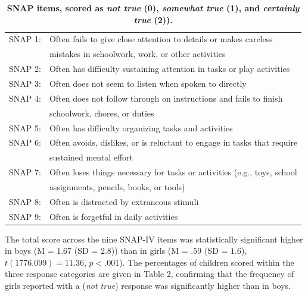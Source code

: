 \documentclass[10pt,letterpaper]{article}
\begin{document}
\begin{table}[!ht]
\begin{adjustwidth}{-5mm}{0in} %
\centering
\caption{\bf SNAP items, scored as \emph{not true} (0), \emph{somewhat true} (1), and \emph{certainly true} (2)).}
\vspace{5mm}
\begin{tabular}{|ll|}
\hline
SNAP 1: & Often fails to give close attention to details or makes careless\\ & mistakes in schoolwork, work, or other activities\\ \hline
SNAP 2: & Often has difficulty sustaining attention in tasks or play activities \\ \hline
SNAP 3: & Often does not seem to listen when spoken to directly \\ \hline
SNAP 4: & Often does not follow through on instructions and fails to finish\\ &  schoolwork, chores, or duties\\ \hline
SNAP 5: & Often has difficulty organizing tasks and activities \\ \hline
SNAP 6: & Often avoids, dislikes, or is reluctant to engage in tasks that require\\ & sustained mental effort\\ \hline
SNAP 7: & Often loses things necessary for tasks or activities (e.g., toys, school\\ &  assignments, pencils, books, or tools) \\ \hline
SNAP 8: & Often is distracted by extraneous stimuli\\ \hline
SNAP 9: & Often is forgetful in daily activities \\ \hline
\end{tabular}
\label{Table1}
\end{adjustwidth}
\end{table}

\vspace{5mm}

The total score across the nine SNAP-IV items was statistically significant higher in boys (M = $1.67$ (SD = $2.8$)) than in girls (M = $.59$ (SD = $1.6$), $t (1776.099) = 11.36$, $p <  .001$). 
The percentages of children scored within the three response categories are given in Table 2, confirming that the  frequency of girls reported with a (\emph{not true}) response was significantly higher than in boys. \\
\end{document}
